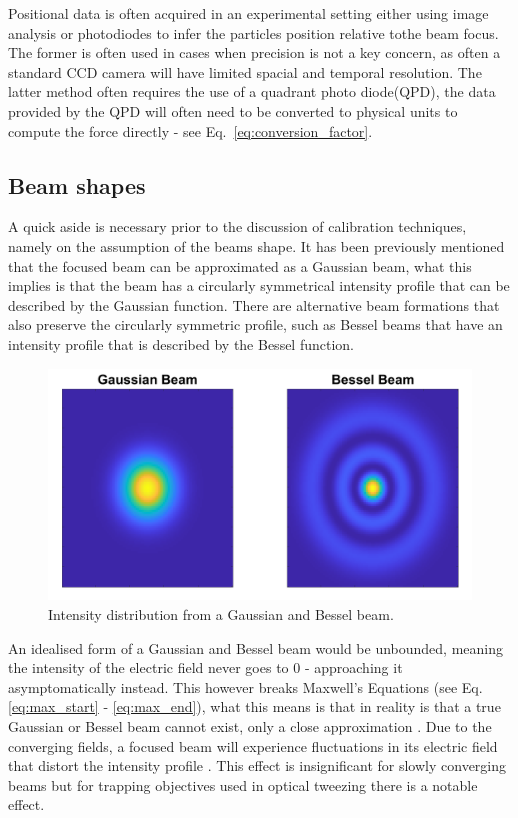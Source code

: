 Positional data is often acquired in an experimental setting 
either using image analysis or photodiodes to infer the particles 
position relative tothe beam focus. The former is often used in 
cases when precision is not a key concern, as often a standard 
CCD camera will have limited spacial and temporal resolution. 
The latter method often requires the use of a quadrant photo 
diode(QPD), the data provided by the QPD will often need to be 
converted to physical units to compute the force directly - see Eq.~\eqref{eq:conversion_factor}.

\subsection{Beam shapes}
A quick aside is necessary prior to the discussion 
of calibration techniques, namely on the assumption 
of the beams shape. It has been previously mentioned 
that the focused beam can be approximated as a 
Gaussian beam, what this implies is that the beam has 
a circularly symmetrical intensity profile that can be
described by the Gaussian function. There are alternative 
beam formations that also preserve the circularly 
symmetric profile, such as Bessel beams that have an 
intensity profile that is described by the Bessel 
function. 
\begin{figure}
	\centering
	\includegraphics[width=\linewidth]{Gaussian_Bessel.png}
	\caption{Intensity distribution from a Gaussian and Bessel
	beam.}
\end{figure}

An idealised form of a Gaussian and Bessel beam would be 
unbounded, meaning the intensity of the electric field 
never goes to 0 - approaching it asymptomatically instead. 
This however breaks Maxwell's Equations (see Eq.
\eqref{eq:max_start} - \eqref{eq:max_end}), what this 
means is that in reality is that a true Gaussian or Bessel 
beam cannot exist, only a close approximation \cite{Gouesbet1988}. 
Due to the converging fields, a focused beam will experience 
fluctuations in its electric field that distort the intensity 
profile \cite{Lock1994}. This effect is insignificant 
for slowly converging beams but for trapping objectives 
used in optical tweezing there is a notable effect. 

